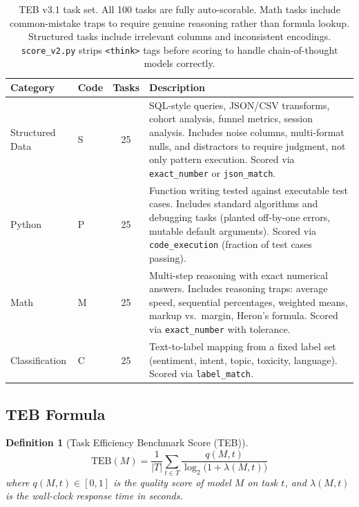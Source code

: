 \documentclass[12pt]{article}
\newtheorem{definition}{Definition}
\begin{document}
\begin{table}[H]
\centering
\small
\begin{tabular}{llcp{6cm}}
\toprule
\textbf{Category} & \textbf{Code} & \textbf{Tasks} & \textbf{Description} \\
\midrule
Structured Data  & S & 25 & SQL-style queries, JSON/CSV transforms, cohort analysis, funnel metrics, session analysis. Includes noise columns, multi-format nulls, and distractors to require judgment, not only pattern execution. Scored via \texttt{exact\_number} or \texttt{json\_match}. \\
Python           & P & 25 & Function writing tested against executable test cases. Includes standard algorithms and debugging tasks (planted off-by-one errors, mutable default arguments). Scored via \texttt{code\_execution} (fraction of test cases passing). \\
Math             & M & 25 & Multi-step reasoning with exact numerical answers. Includes reasoning traps: average speed, sequential percentages, weighted means, markup vs.\ margin, Heron's formula. Scored via \texttt{exact\_number} with tolerance. \\
Classification   & C & 25 & Text-to-label mapping from a fixed label set (sentiment, intent, topic, toxicity, language). Scored via \texttt{label\_match}. \\
\bottomrule
\end{tabular}
\caption{TEB v3.1 task set. All 100 tasks are fully auto-scorable. Math tasks include common-mistake traps to require genuine reasoning rather than formula lookup. Structured tasks include irrelevant columns and inconsistent encodings. \texttt{score\_v2.py} strips \texttt{<think>} tags before scoring to handle chain-of-thought models correctly.}
\label{tab:teb-tasks}
\end{table}

\subsection{TEB Formula}

\begin{definition}[Task Efficiency Benchmark Score (TEB)]
\begin{equation}
\boxed{\mathrm{TEB}(M) = \frac{1}{|T|}\sum_{t \in T} \frac{q(M,t)}{\log_2\!\bigl(1 + \lambda(M,t)\bigr)}}
\end{equation}
where $q(M,t) \in [0,1]$ is the quality score of model $M$ on task $t$, and $\lambda(M,t)$ is the wall-clock response time in seconds.
\end{definition}
\end{document}
